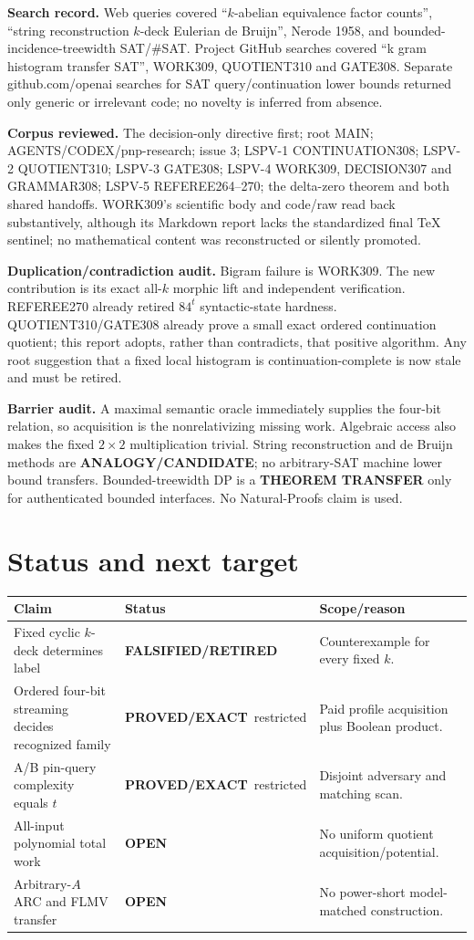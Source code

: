 \documentclass[11pt]{article}
\begin{document}
\textbf{Search record.} Web queries covered ``$k$-abelian equivalence factor
counts'', ``string reconstruction $k$-deck Eulerian de Bruijn'', Nerode 1958,
and bounded-incidence-treewidth SAT/\#SAT.  Project GitHub searches covered
``k gram histogram transfer SAT'', WORK309, QUOTIENT310 and GATE308.  Separate
github.com/openai searches for SAT query/continuation lower bounds returned only
generic or irrelevant code; no novelty is inferred from absence.

\textbf{Corpus reviewed.} The decision-only directive first; root MAIN;
AGENTS/CODEX/pnp-research; issue 3; LSPV-1 CONTINUATION308; LSPV-2 QUOTIENT310;
LSPV-3 GATE308; LSPV-4 WORK309, DECISION307 and GRAMMAR308; LSPV-5
REFEREE264--270; the delta-zero theorem and both shared handoffs.  WORK309's
scientific body and code/raw read back substantively, although its Markdown
report lacks the standardized final TeX sentinel; no mathematical content was
reconstructed or silently promoted.

\textbf{Duplication/contradiction audit.} Bigram failure is WORK309.  The new
contribution is its exact all-$k$ morphic lift and independent verification.
REFEREE270 already retired $84^t$ syntactic-state hardness.  QUOTIENT310/GATE308
already prove a small exact ordered continuation quotient; this report adopts,
rather than contradicts, that positive algorithm.  Any root suggestion that a
fixed local histogram is continuation-complete is now stale and must be retired.

\textbf{Barrier audit.} A maximal semantic oracle immediately supplies the four-bit
relation, so acquisition is the nonrelativizing missing work.  Algebraic access
also makes the fixed $2\times2$ multiplication trivial.  String reconstruction
and de Bruijn methods are \textbf{ANALOGY/CANDIDATE}; no arbitrary-SAT machine
lower bound transfers.  Bounded-treewidth DP is a \textbf{THEOREM TRANSFER} only
for authenticated bounded interfaces.  No Natural-Proofs claim is used.

\section{Status and next target}
\begin{center}\scriptsize\begin{tabular}{p{.36\linewidth}p{.19\linewidth}p{.29\linewidth}}\toprule
Claim&Status&Scope/reason\\\midrule
Fixed cyclic $k$-deck determines label&\textbf{FALSIFIED/RETIRED}&Counterexample for every fixed $k$.\\
Ordered four-bit streaming decides recognized family&\textbf{PROVED/EXACT}\ restricted&Paid profile acquisition plus Boolean product.\\
A/B pin-query complexity equals $t$&\textbf{PROVED/EXACT}\ restricted&Disjoint adversary and matching scan.\\
All-input polynomial total work&\textbf{OPEN}&No uniform quotient acquisition/potential.\\
Arbitrary-$A$ ARC and FLMV transfer&\textbf{OPEN}&No power-short model-matched construction.\\\bottomrule
\end{tabular}\end{center}
\end{document}
